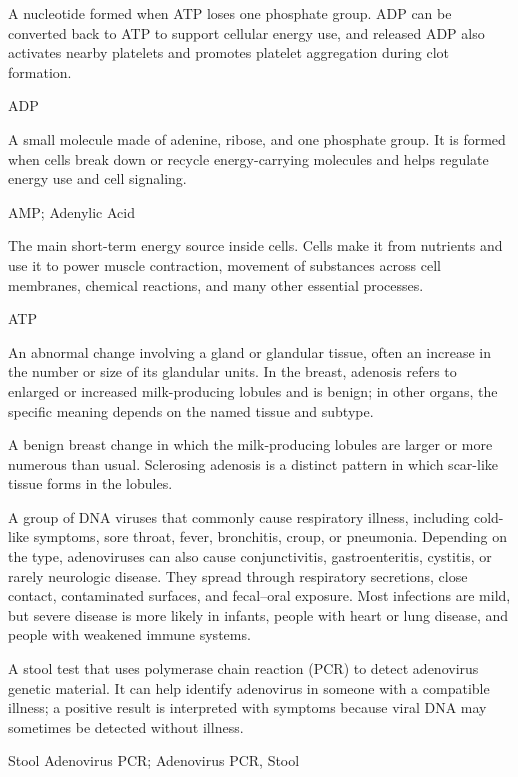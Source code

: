  A nucleotide formed when ATP loses one phosphate group. ADP can be converted back to ATP to support cellular energy use, and released ADP also activates nearby platelets and promotes platelet aggregation during clot formation.

\synonyms
ADP

 A small molecule made of adenine, ribose, and one phosphate group. It is formed when cells break down or recycle energy-carrying molecules and helps regulate energy use and cell signaling.

\synonyms
AMP; Adenylic Acid

 The main short-term energy source inside cells. Cells make it from nutrients and use it to power muscle contraction, movement of substances across cell membranes, chemical reactions, and many other essential processes.

\synonyms
ATP

 An abnormal change involving a gland or glandular tissue, often an increase in the number or size of its glandular units. In the breast, adenosis refers to enlarged or increased milk-producing lobules and is benign; in other organs, the specific meaning depends on the named tissue and subtype.

 A benign breast change in which the milk-producing lobules are larger or more numerous than usual. Sclerosing adenosis is a distinct pattern in which scar-like tissue forms in the lobules.

 A group of DNA viruses that commonly cause respiratory illness, including cold-like symptoms, sore throat, fever, bronchitis, croup, or pneumonia. Depending on the type, adenoviruses can also cause conjunctivitis, gastroenteritis, cystitis, or rarely neurologic disease. They spread through respiratory secretions, close contact, contaminated surfaces, and fecal--oral exposure. Most infections are mild, but severe disease is more likely in infants, people with heart or lung disease, and people with weakened immune systems.

 A stool test that uses polymerase chain reaction (PCR) to detect adenovirus genetic material. It can help identify adenovirus in someone with a compatible illness; a positive result is interpreted with symptoms because viral DNA may sometimes be detected without illness.

\synonyms
Stool Adenovirus PCR; Adenovirus PCR, Stool

